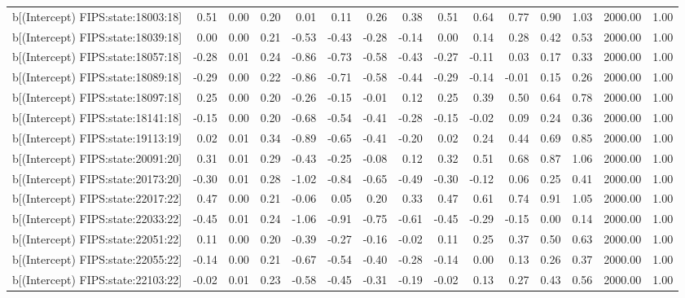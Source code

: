 \begin{table}[ht]
\begin{tabular}{rrrrrrrrrrrrrrr}
  b[(Intercept) FIPS:state:18003:18] & 0.51 & 0.00 & 0.20 & 0.01 & 0.11 & 0.26 & 0.38 & 0.51 & 0.64 & 0.77 & 0.90 & 1.03 & 2000.00 & 1.00 \\ 
  b[(Intercept) FIPS:state:18039:18] & 0.00 & 0.00 & 0.21 & -0.53 & -0.43 & -0.28 & -0.14 & 0.00 & 0.14 & 0.28 & 0.42 & 0.53 & 2000.00 & 1.00 \\ 
  b[(Intercept) FIPS:state:18057:18] & -0.28 & 0.01 & 0.24 & -0.86 & -0.73 & -0.58 & -0.43 & -0.27 & -0.11 & 0.03 & 0.17 & 0.33 & 2000.00 & 1.00 \\ 
  b[(Intercept) FIPS:state:18089:18] & -0.29 & 0.00 & 0.22 & -0.86 & -0.71 & -0.58 & -0.44 & -0.29 & -0.14 & -0.01 & 0.15 & 0.26 & 2000.00 & 1.00 \\ 
  b[(Intercept) FIPS:state:18097:18] & 0.25 & 0.00 & 0.20 & -0.26 & -0.15 & -0.01 & 0.12 & 0.25 & 0.39 & 0.50 & 0.64 & 0.78 & 2000.00 & 1.00 \\ 
  b[(Intercept) FIPS:state:18141:18] & -0.15 & 0.00 & 0.20 & -0.68 & -0.54 & -0.41 & -0.28 & -0.15 & -0.02 & 0.09 & 0.24 & 0.36 & 2000.00 & 1.00 \\ 
  b[(Intercept) FIPS:state:19113:19] & 0.02 & 0.01 & 0.34 & -0.89 & -0.65 & -0.41 & -0.20 & 0.02 & 0.24 & 0.44 & 0.69 & 0.85 & 2000.00 & 1.00 \\ 
  b[(Intercept) FIPS:state:20091:20] & 0.31 & 0.01 & 0.29 & -0.43 & -0.25 & -0.08 & 0.12 & 0.32 & 0.51 & 0.68 & 0.87 & 1.06 & 2000.00 & 1.00 \\ 
  b[(Intercept) FIPS:state:20173:20] & -0.30 & 0.01 & 0.28 & -1.02 & -0.84 & -0.65 & -0.49 & -0.30 & -0.12 & 0.06 & 0.25 & 0.41 & 2000.00 & 1.00 \\ 
  b[(Intercept) FIPS:state:22017:22] & 0.47 & 0.00 & 0.21 & -0.06 & 0.05 & 0.20 & 0.33 & 0.47 & 0.61 & 0.74 & 0.91 & 1.05 & 2000.00 & 1.00 \\ 
  b[(Intercept) FIPS:state:22033:22] & -0.45 & 0.01 & 0.24 & -1.06 & -0.91 & -0.75 & -0.61 & -0.45 & -0.29 & -0.15 & 0.00 & 0.14 & 2000.00 & 1.00 \\ 
  b[(Intercept) FIPS:state:22051:22] & 0.11 & 0.00 & 0.20 & -0.39 & -0.27 & -0.16 & -0.02 & 0.11 & 0.25 & 0.37 & 0.50 & 0.63 & 2000.00 & 1.00 \\ 
  b[(Intercept) FIPS:state:22055:22] & -0.14 & 0.00 & 0.21 & -0.67 & -0.54 & -0.40 & -0.28 & -0.14 & 0.00 & 0.13 & 0.26 & 0.37 & 2000.00 & 1.00 \\ 
  b[(Intercept) FIPS:state:22103:22] & -0.02 & 0.01 & 0.23 & -0.58 & -0.45 & -0.31 & -0.19 & -0.02 & 0.13 & 0.27 & 0.43 & 0.56 & 2000.00 & 1.00 \\ 

\end{tabular}
\end{table}
